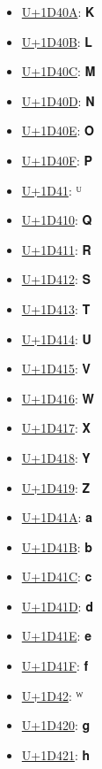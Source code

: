 \begin{itemize}
	\item \href{https://decodeunicode.org/en/u+1D40A}{U+1D40A}: 𝐊
	\item \href{https://decodeunicode.org/en/u+1D40B}{U+1D40B}: 𝐋
	\item \href{https://decodeunicode.org/en/u+1D40C}{U+1D40C}: 𝐌
	\item \href{https://decodeunicode.org/en/u+1D40D}{U+1D40D}: 𝐍
	\item \href{https://decodeunicode.org/en/u+1D40E}{U+1D40E}: 𝐎
	\item \href{https://decodeunicode.org/en/u+1D40F}{U+1D40F}: 𝐏
	\item \href{https://decodeunicode.org/en/u+1D41}{U+1D41}: ᵁ
	\item \href{https://decodeunicode.org/en/u+1D410}{U+1D410}: 𝐐
	\item \href{https://decodeunicode.org/en/u+1D411}{U+1D411}: 𝐑
	\item \href{https://decodeunicode.org/en/u+1D412}{U+1D412}: 𝐒
	\item \href{https://decodeunicode.org/en/u+1D413}{U+1D413}: 𝐓
	\item \href{https://decodeunicode.org/en/u+1D414}{U+1D414}: 𝐔
	\item \href{https://decodeunicode.org/en/u+1D415}{U+1D415}: 𝐕
	\item \href{https://decodeunicode.org/en/u+1D416}{U+1D416}: 𝐖
	\item \href{https://decodeunicode.org/en/u+1D417}{U+1D417}: 𝐗
	\item \href{https://decodeunicode.org/en/u+1D418}{U+1D418}: 𝐘
	\item \href{https://decodeunicode.org/en/u+1D419}{U+1D419}: 𝐙
	\item \href{https://decodeunicode.org/en/u+1D41A}{U+1D41A}: 𝐚
	\item \href{https://decodeunicode.org/en/u+1D41B}{U+1D41B}: 𝐛
	\item \href{https://decodeunicode.org/en/u+1D41C}{U+1D41C}: 𝐜
	\item \href{https://decodeunicode.org/en/u+1D41D}{U+1D41D}: 𝐝
	\item \href{https://decodeunicode.org/en/u+1D41E}{U+1D41E}: 𝐞
	\item \href{https://decodeunicode.org/en/u+1D41F}{U+1D41F}: 𝐟
	\item \href{https://decodeunicode.org/en/u+1D42}{U+1D42}: ᵂ
	\item \href{https://decodeunicode.org/en/u+1D420}{U+1D420}: 𝐠
	\item \href{https://decodeunicode.org/en/u+1D421}{U+1D421}: 𝐡

\end{itemize}
